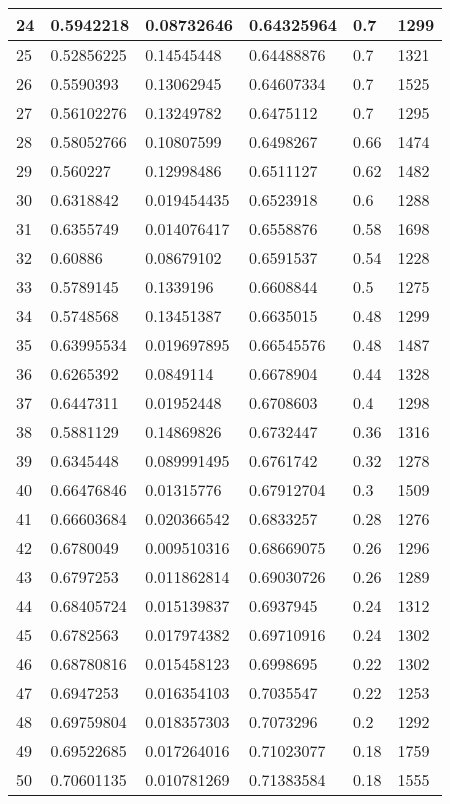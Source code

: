 \begin{longtable}{|l|l|l|l|l|l|}
24 & 0.5942218 & 0.08732646 & 0.64325964 & 0.7 & 1299 \\ \hline 
25 & 0.52856225 & 0.14545448 & 0.64488876 & 0.7 & 1321 \\ \hline 
26 & 0.5590393 & 0.13062945 & 0.64607334 & 0.7 & 1525 \\ \hline 
27 & 0.56102276 & 0.13249782 & 0.6475112 & 0.7 & 1295 \\ \hline 
28 & 0.58052766 & 0.10807599 & 0.6498267 & 0.66 & 1474 \\ \hline 
29 & 0.560227 & 0.12998486 & 0.6511127 & 0.62 & 1482 \\ \hline 
30 & 0.6318842 & 0.019454435 & 0.6523918 & 0.6 & 1288 \\ \hline 
31 & 0.6355749 & 0.014076417 & 0.6558876 & 0.58 & 1698 \\ \hline 
32 & 0.60886 & 0.08679102 & 0.6591537 & 0.54 & 1228 \\ \hline 
33 & 0.5789145 & 0.1339196 & 0.6608844 & 0.5 & 1275 \\ \hline 
34 & 0.5748568 & 0.13451387 & 0.6635015 & 0.48 & 1299 \\ \hline 
35 & 0.63995534 & 0.019697895 & 0.66545576 & 0.48 & 1487 \\ \hline 
36 & 0.6265392 & 0.0849114 & 0.6678904 & 0.44 & 1328 \\ \hline 
37 & 0.6447311 & 0.01952448 & 0.6708603 & 0.4 & 1298 \\ \hline 
38 & 0.5881129 & 0.14869826 & 0.6732447 & 0.36 & 1316 \\ \hline 
39 & 0.6345448 & 0.089991495 & 0.6761742 & 0.32 & 1278 \\ \hline 
40 & 0.66476846 & 0.01315776 & 0.67912704 & 0.3 & 1509 \\ \hline 
41 & 0.66603684 & 0.020366542 & 0.6833257 & 0.28 & 1276 \\ \hline 
42 & 0.6780049 & 0.009510316 & 0.68669075 & 0.26 & 1296 \\ \hline 
43 & 0.6797253 & 0.011862814 & 0.69030726 & 0.26 & 1289 \\ \hline 
44 & 0.68405724 & 0.015139837 & 0.6937945 & 0.24 & 1312 \\ \hline 
45 & 0.6782563 & 0.017974382 & 0.69710916 & 0.24 & 1302 \\ \hline 
46 & 0.68780816 & 0.015458123 & 0.6998695 & 0.22 & 1302 \\ \hline 
47 & 0.6947253 & 0.016354103 & 0.7035547 & 0.22 & 1253 \\ \hline 
48 & 0.69759804 & 0.018357303 & 0.7073296 & 0.2 & 1292 \\ \hline 
49 & 0.69522685 & 0.017264016 & 0.71023077 & 0.18 & 1759 \\ \hline 
50 & 0.70601135 & 0.010781269 & 0.71383584 & 0.18 & 1555 \\ \hline 
\end{longtable}